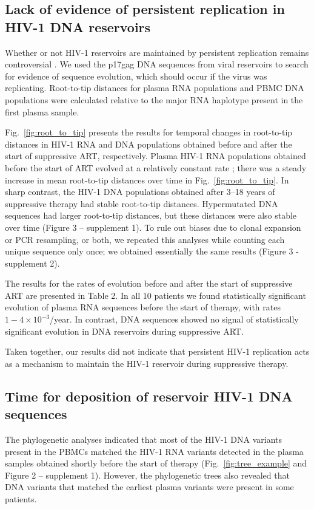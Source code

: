 \documentclass[aps,rmp,onecolumn,linenumbers]{revtex4-1}
\newcommand{\FIG}[1]{Fig.~\ref{fig:#1}}
\begin{document}
\subsection*{Lack of evidence of persistent replication in HIV-1 DNA reservoirs}
Whether or not HIV-1 reservoirs are maintained by persistent replication remains controversial \cite{stockenstrom_longitudinal_2015,chomont_maintenance_2011,chomont_hiv_2009,buzon_hiv-1_2010,yukl_effect_2010,lorenzo-redondo_persistent_2016,evering_absence_2012}. We used the p17gag DNA sequences from viral reservoirs to search for evidence of sequence evolution, which should occur if the virus was replicating. Root-to-tip distances for plasma RNA populations and PBMC DNA populations were calculated relative to the major RNA haplotype present in the first plasma sample.

\FIG{root_to_tip} presents the results for temporal changes in root-to-tip distances in HIV-1 RNA and DNA populations obtained before and after the start of suppressive ART, respectively. Plasma HIV-1 RNA populations obtained before the start of ART evolved at a relatively constant rate \cite{zanini_population_2016}; there was a steady increase in mean root-to-tip distances over time in \FIG{root_to_tip}. In sharp contrast, the HIV-1 DNA populations obtained after 3--18 years of suppressive therapy had stable root-to-tip distances. Hypermutated DNA sequences had larger root-to-tip distances, but these distances were also stable over time (Figure 3 -- supplement 1). To rule out biases due to clonal expansion or PCR resampling, or both, we repeated this analyses while counting each unique sequence only once; we obtained essentially the same results (Figure 3 - supplement 2).

The results for the rates of evolution before and after the start of suppressive ART are presented in Table 2. In all 10 patients we found statistically significant evolution of plasma RNA sequences before the start of therapy, with rates $1-4\times 10^{-3}$/year. In contrast, DNA sequences showed no signal of statistically significant evolution in DNA reservoirs during suppressive ART. 

Taken together, our results did not indicate that persistent HIV-1 replication acts as a mechanism to maintain the HIV-1 reservoir during suppressive therapy.

\subsection*{Time for deposition of reservoir HIV-1 DNA sequences}
The phylogenetic analyses indicated that most of the HIV-1 DNA variants present in the PBMCs matched the HIV-1 RNA variants detected in the plasma samples obtained shortly before the start of therapy (\FIG{tree_example} and Figure 2 -- supplement 1). However, the phylogenetic trees also revealed that DNA variants that matched the earliest plasma variants were present in some patients. 
\end{document}
